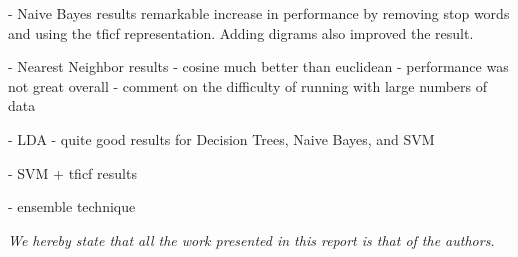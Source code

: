\documentclass[conference,letterpaper]{IEEEtran}
\begin{document}
- Naive Bayes results
	remarkable increase in performance by removing stop words and using the
	tficf representation.  Adding digrams also improved the result.

- Nearest Neighbor results
	- cosine much better than euclidean
	- performance was not great overall
	- comment on the difficulty of running with large numbers of data

- LDA
	- quite good results for Decision Trees, Naive Bayes, and SVM

- SVM + tficf results

- ensemble technique

\begin{center}
	\textit{
		We hereby state that all the work presented in this report is 
		that of the authors.
	}
\end{center}


\end{document}
